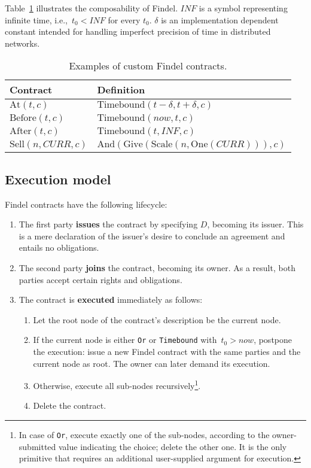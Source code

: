 Table~\ref{tab:Ch10FindelComposability} illustrates the composability of Findel.
$INF$ is a symbol representing infinite time, i.e.,~$t_0 < INF$ for every $t_0$.
$\delta$ is an implementation dependent constant intended for handling imperfect precision of time in distributed networks.

\begin{table}%
	\centering
	\begin{tabular}{|p{0.25\linewidth}|p{0.70\linewidth}|}
		\hline
		\textbf{Contract} & \textbf{Definition} \\
		\hline
		\(\mathrm{At}(t, c)\) & \(\mathrm{Timebound}(t - \delta, t + \delta, c)\) \\
		\hline
		\(\mathrm{Before}(t, c)\) & \(\mathrm{Timebound}(now, t, c)\) \\
		\hline
		\(\mathrm{After}(t, c)\) & \(\mathrm{Timebound}(t, INF, c)\) \\
		\hline
		\(\mathrm{Sell}(n, CURR, c)\) & \(\mathrm{And}(\mathrm{Give}(\mathrm{Scale}(n,\mathrm{One}(CURR))),c)\) \\
		\hline
	\end{tabular}
	\caption{Examples of custom Findel contracts.}
	\label{tab:Ch10FindelComposability}
\end{table}



\subsection{Execution model} \label{sec:Ch10FindelExecutionModel}

Findel contracts have the following lifecycle:

\begin{enumerate}
	\item The first party \textbf{issues} the contract by specifying $D$, becoming its issuer. This is a mere declaration of the issuer's desire to conclude an agreement and entails no obligations.
	\item The second party \textbf{joins} the contract, becoming its owner. As a result, both parties accept certain rights and obligations.
	\item The contract is \textbf{executed} immediately as follows:
	\begin{enumerate}
		\item Let the root node of the contract's description be the current node.
		\item If the current node is either \texttt{Or} or \texttt{Timebound} with~$t_0 > now$, postpone the execution: issue a new Findel contract with the same parties and the current node as root. The owner can later demand its execution.
		\item Otherwise, execute all sub-nodes recursively\footnote{In case of \texttt{Or}, execute exactly one of the sub-nodes, according to the owner-submitted value indicating the choice; delete the other one. It is the only primitive that requires an additional user-supplied argument for execution.}.
		\item Delete the contract.
	\end{enumerate}
\end{enumerate}

